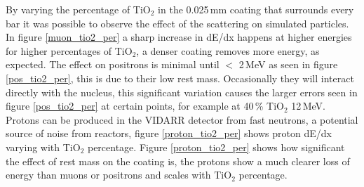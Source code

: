 \documentclass[12pt,a4paper]{article}
\begin{document}

By varying the percentage of TiO$_2$ in the 0.025\,mm coating that surrounds every bar it was possible to observe the effect of the scattering on simulated particles. In figure \ref{muon_tio2_per} a sharp increase in dE/dx happens at higher energies for higher percentages of TiO$_2$, a denser coating removes more energy, as expected. The effect on positrons is minimal until $<$ 2\,MeV as seen in figure \ref{pos_tio2_per}, this is due to their low rest mass. Occasionally they will interact directly with the nucleus, this significant variation causes the larger errors seen in figure \ref{pos_tio2_per} at certain points, for example at 40\,\% TiO$_2$ 12\,MeV. Protons can be produced in the VIDARR detector from fast neutrons, a potential source of noise from reactors, figure \ref{proton_tio2_per} shows proton dE/dx varying with TiO$_2$ percentage. Figure \ref{proton_tio2_per} shows how significant the effect of rest mass on the coating is, the protons show a much clearer loss of energy than muons or positrons and scales with TiO$_2$ percentage.
\end{document}
